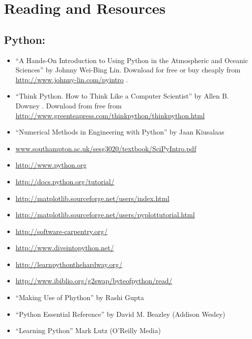\clearpage{}


\section*{{\large{}Reading and Resources}}


\subsection*{Python:}
\begin{itemize}
\item ``A Hands-On Introduction to Using Python in the Atmospheric and
Oceanic Sciences'' by Johnny Wei-Bing Lin. Download for free or buy
cheaply from \url{http://www.johnny-lin.com/pyintro} .
\item ``Think Python. How to Think Like a Computer Scientist'' by Allen
B. Downey . Download from free from \url{http://www.greenteapress.com/thinkpython/thinkpython.html}
\item ``Numerical Methods in Engineering with Python'' by Jaan Kiusalaas 
\item \url{www.southampton.ac.uk/sesg3020/textbook/SciPyIntro.pdf} 
\item \url{http://www.python.org} 
\item \url{http://docs.python.org/tutorial/} 
\item \url{http://matplotlib.sourceforge.net/users/index.html} 
\item \url{http://matplotlib.sourceforge.net/users/pyplottutorial.html} 
\item \url{http://software-carpentry.org/} 
\item \url{http://www.diveintopython.net/} 
\item \url{http://learnpythonthehardway.org/} 
\item \url{http://www.ibiblio.org/g2swap/byteofpython/read/} 
\item ``Making Use of Phython'' by Rashi Gupta 
\item ``Python Essential Reference'' by David M. Beazley (Addison Wesley) 
\item ``Learning Python'' Mark Lutz (O'Reilly Media) 
\end{itemize}

